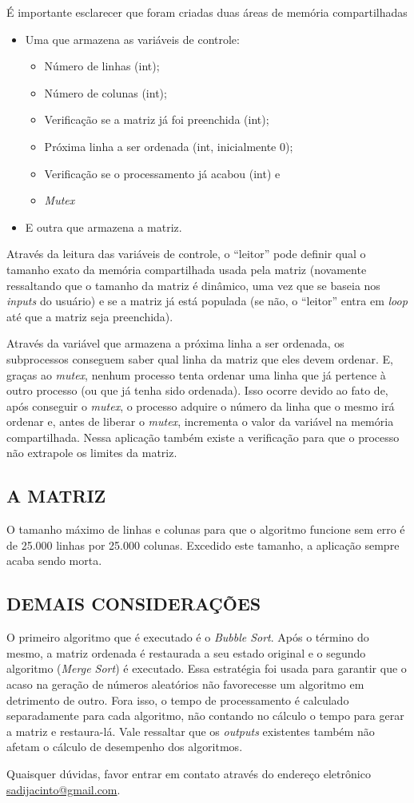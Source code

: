 	É importante esclarecer que foram criadas duas áreas de memória compartilhadas
		\begin{itemize}
			\item Uma que armazena as variáveis de controle:
				\begin{itemize}
					\item Número de linhas (int);
					\item Número de colunas (int);
					\item Verificação se a matriz já foi preenchida (int);
					\item Próxima linha a ser ordenada (int, inicialmente 0);
					\item Verificação se o processamento já acabou (int) e
					\item \textit{Mutex}
				\end{itemize}
			\item E outra que armazena a matriz.
		\end{itemize}		
	
	Através da leitura das variáveis de controle, o ``leitor'' pode definir qual o tamanho exato da memória compartilhada usada pela matriz (novamente ressaltando que o tamanho da matriz é dinâmico, uma vez que se baseia nos \textit{inputs} do usuário) e se a matriz já está populada (se não, o ``leitor'' entra em \textit{loop} até que a matriz seja preenchida).
	
	Através da variável que armazena a próxima linha a ser ordenada, os subprocessos conseguem saber qual linha da matriz que eles devem ordenar. E, graças ao \textit{mutex}, nenhum processo tenta ordenar uma linha que já pertence à outro processo (ou que já tenha sido ordenada). Isso ocorre devido ao fato de, após conseguir o \textit{mutex}, o processo adquire o número da linha que o mesmo irá ordenar e, antes de liberar o \textit{mutex}, incrementa o valor da variável na memória compartilhada. Nessa aplicação também existe a verificação para que o processo não extrapole os limites da matriz.
	
	\subsection{\normalsize A MATRIZ}
		O tamanho máximo de linhas e colunas para que o algoritmo funcione sem erro é de 25.000 linhas por 25.000 colunas. Excedido este tamanho, a aplicação sempre acaba sendo morta.
	
	\subsection{\normalsize DEMAIS CONSIDERAÇÕES}
		O primeiro algoritmo que é executado é o \textit{Bubble Sort}. Após o término do mesmo, a matriz ordenada é restaurada a seu estado original e o segundo algoritmo (\textit{Merge Sort}) é executado. Essa estratégia foi usada para garantir que o acaso na geração de números aleatórios não favorecesse um algoritmo em detrimento de outro. Fora isso, o tempo de processamento é calculado separadamente para cada algoritmo, não contando no cálculo o tempo para gerar a matriz e restaura-lá. Vale ressaltar que os \textit{outputs} existentes também não afetam o cálculo de desempenho dos algoritmos.
		
		Quaisquer dúvidas, favor entrar em contato através do endereço eletrônico \url{sadijacinto@gmail.com}.		
